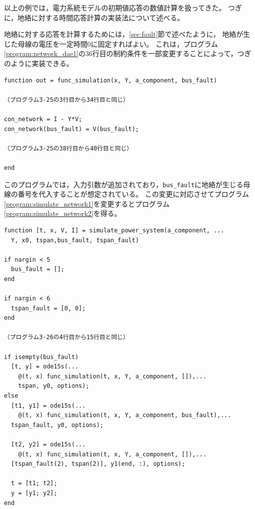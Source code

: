 \documentclass[tombow,dvipdfmx]{corona-a5-1.1}
\begin{document}
以上の例では，電力系統モデルの初期値応答の数値計算を扱ってきた。
つぎに，地絡に対する時間応答計算の実装法について述べる。

\begin{例}[地絡に対する時間応答の数値計算]
地絡に対する応答を計算するためには，\ref{sec:fault}節で述べたように，
地絡が生じた母線の電圧を一定時間$0$に固定すればよい。
これは，プログラム\nobreak\ref{program:network_dae1}の36行目の制約条件を一部変更することによって，つぎのように実装できる。

\smallskip
\begin{PROGRAMA}[count,title={func\_simulation.m}]\label{program:network_dae_fault}
\begin{verbatim}
function out = func_simulation(x, Y, a_component, bus_fault)

（プログラム3-25の3行目から34行目と同じ）

con_network = I - Y*V;
con_network(bus_fault) = V(bus_fault);

（プログラム3-25の38行目から40行目と同じ）

end
\end{verbatim}
\end{PROGRAMA}

このプログラムでは，入力引数が追加されており，\verb|bus_fault|に地絡が生じる母線の番号を代入することが想定されている。
この変更に対応させてプログラム\nobreak\ref{program:simulate_network1}を変更するとプログラム\ref{program:simulate_network2}を得る。

\smallskip
\begin{PROGRAMA}[count,title={simulate\_power\_system.m}]\label{program:simulate_network2}
  \begin{verbatim}
function [t, x, V, I] = simulate_power_system(a_component, ...
  Y, x0, tspan,bus_fault, tspan_fault)

if nargin < 5
  bus_fault = [];
end

if nargin < 6
  tspan_fault = [0, 0];
end

（プログラム3-26の4行目から15行目と同じ）

if isempty(bus_fault)
  [t, y] = ode15s(...
    @(t, x) func_simulation(t, x, Y, a_component, []),...
    tspan, y0, options);
else
  [t1, y1] = ode15s(...
    @(t, x) func_simulation(t, x, Y, a_component, bus_fault),...
  tspan_fault, y0, options);
  
  [t2, y2] = ode15s(...
    @(t, x) func_simulation(t, x, Y, a_component, []),...
  [tspan_fault(2), tspan(2)], y1(end, :), options);

  t = [t1; t2];
  y = [y1; y2];
end


\end{verbatim}
\end{PROGRAMA}
\end{例}
\end{document}
